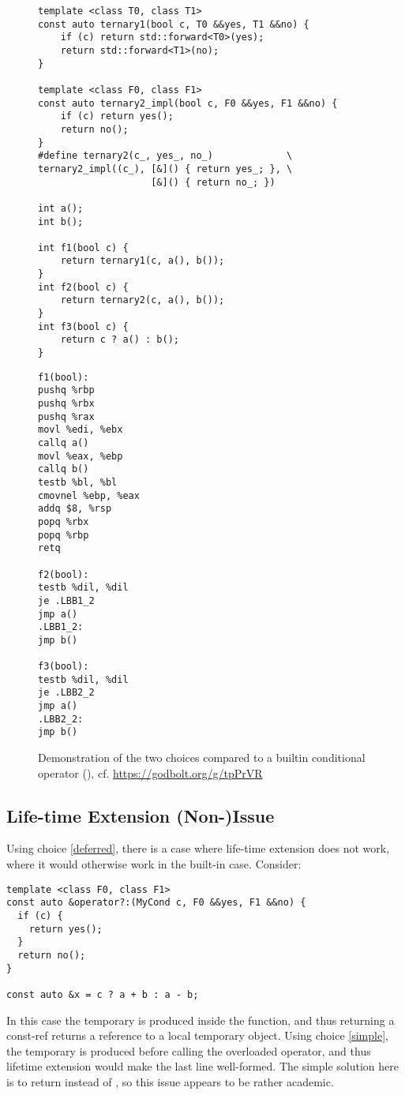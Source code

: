 \begin{figure}
  \centering
  \begin{minipage}[t]{.7\linewidth}
    \begin{lstlisting}[style=Vc]
template <class T0, class T1>
const auto ternary1(bool c, T0 &&yes, T1 &&no) {
    if (c) return std::forward<T0>(yes);
    return std::forward<T1>(no);
}

template <class F0, class F1>
const auto ternary2_impl(bool c, F0 &&yes, F1 &&no) {
    if (c) return yes();
    return no();
}
#define ternary2(c_, yes_, no_)             \
ternary2_impl((c_), [&]() { return yes_; }, \
                    [&]() { return no_; })

int a();
int b();

int f1(bool c) {
    return ternary1(c, a(), b());
}
int f2(bool c) {
    return ternary2(c, a(), b());
}
int f3(bool c) {
    return c ? a() : b();
}
    \end{lstlisting}
  \end{minipage}\hfill%
  \begin{minipage}[t]{.25\linewidth}
    \begin{lstlisting}[language={}]
f1(bool):
pushq %rbp
pushq %rbx
pushq %rax
movl %edi, %ebx
callq a()
movl %eax, %ebp
callq b()
testb %bl, %bl
cmovnel %ebp, %eax
addq $8, %rsp
popq %rbx
popq %rbp
retq

f2(bool):
testb %dil, %dil
je .LBB1_2
jmp a()
.LBB1_2:
jmp b()

f3(bool):
testb %dil, %dil
je .LBB2_2
jmp a()
.LBB2_2:
jmp b()
    \end{lstlisting}
  \end{minipage}
  \caption{Demonstration of the two choices compared to a builtin conditional operator (), cf. \url{https://godbolt.org/g/tpPrVR}}
  \label{fig:demo}
\end{figure}

\subsection{Life-time Extension (Non-)Issue}
Using choice \ref{deferred}, there is a case where life-time extension does not work, where it would otherwise work in the built-in case.
Consider:
\smallskip\begin{lstlisting}[style=Vc]
template <class F0, class F1>
const auto &operator?:(MyCond c, F0 &&yes, F1 &&no) {
  if (c) {
    return yes();
  }
  return no();
}

const auto &x = c ? a + b : a - b;
\end{lstlisting}
In this case the temporary is produced inside the  function, and thus returning a const-ref returns a reference to a local temporary object.
Using choice \ref{simple}, the temporary is produced before calling the overloaded operator, and thus lifetime extension would make the last line well-formed.
The simple solution here is to return \code{auto} instead of \code{const auto \&}, so this issue appears to be rather academic.

